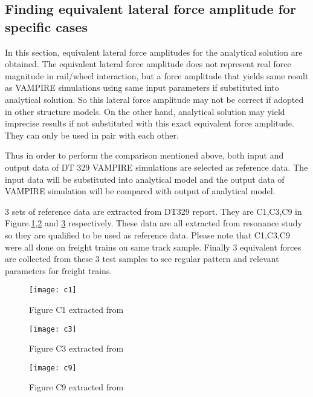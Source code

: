 \subsection{Finding equivalent lateral force amplitude for specific cases}\label{sec:findingequivalentamplitude}
In this section, equivalent lateral force amplitudes for the analytical solution are obtained. The equivalent lateral force amplitude does not represent real force magnitude in rail/wheel interaction, but a force amplitude that yields same result as VAMPIRE simulations using same input parameters if substituted into analytical solution. So this lateral force amplitude may not be correct if adopted in other structure models. On the other hand, analytical solution may yield imprecise results if not substituted with this exact equivalent force amplitude. They can only be used in pair with each other.

Thus in order to perform the comparison mentioned above, both input and output data of DT 329 VAMPIRE simulations are selected as reference data. The input data will be substituted into analytical model and the output data of VAMPIRE simulation will be compared with output of analytical model. 

3 sets of reference data are extracted from DT329 report. They are C1,C3,C9 in Figure.\ref{fig:c1},\ref{fig:c3} and \ref{fig:c9} respectively. These data are all extracted from resonance study so they are qualified to be used as reference data. Please note that C1,C3,C9 were all done on freight trains on same track sample. Finally 3 equivalent forces are collected from these 3 test samples to see regular pattern and relevant parameters for freight trains.

\begin{figure}[h!]
    \centering
    \texttt{[image: c1]}
    \caption{Figure C1 extracted from \citet{d181dt329} }
    \label{fig:c1}
\end{figure}

\begin{figure}[h!]
    \centering
    \texttt{[image: c3]}
    \caption{Figure C3 extracted from \citet{d181dt329} }
    \label{fig:c3}
\end{figure}

\begin{figure}[h!]
    \centering
    \texttt{[image: c9]}
    \caption{Figure C9 extracted from \citet{d181dt329} }
    \label{fig:c9}
\end{figure}

